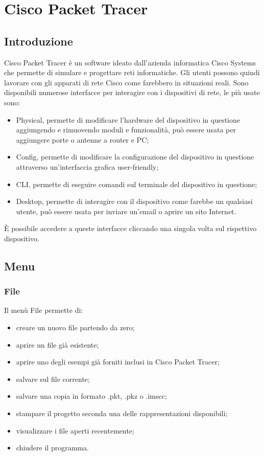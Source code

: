 \section{Cisco Packet Tracer}

\subsection{Introduzione}
Cisco Packet Tracer è un software ideato dall'azienda informatica Cisco Systems che permette di simulare e progettare reti informatiche. Gli utenti possono quindi lavorare con gli apparati di rete Cisco come farebbero in situazioni reali. \newline
Sono disponibili numerose interfacce per interagire con i dispositivi di rete, le più usate sono:
%
\begin{itemize}
    \item Physical, permette di modificare l'hardware del dispositivo in questione aggiungendo e rimuovendo moduli e funzionalità, può essere usata per aggiungere porte o antenne a router e PC;
    \item Config, permette di modificare la configurazione del dispositivo in questione attraverso un'interfaccia grafica user-friendly;
    \item CLI, permette di eseguire comandi sul terminale del dispositivo in questione;
    \item Desktop, permette di interagire con il dispositivo come farebbe un qualsiasi utente, può essere usata per inviare un'email o aprire un sito Internet.
\end{itemize}
%
È possibile accedere a queste interfacce cliccando una singola volta sul rispettivo dispositivo.

\subsection{Menu}

\subsubsection{File}
Il menù File permette di: 

\begin{itemize}
    \item creare un nuovo file partendo da zero;
    \item aprire un file già esistente;
    \item aprire uno degli esempi già forniti inclusi in Cisco Packet Tracer;
    \item salvare sul file corrente;
    \item salvare una copia in formato .pkt, .pkz o .imscc;
    \item stampare il progetto seconda una delle rappresentazioni disponibili;
    \item visualizzare i file aperti recentemente;
    \item chiudere il programma.
\end{itemize}

